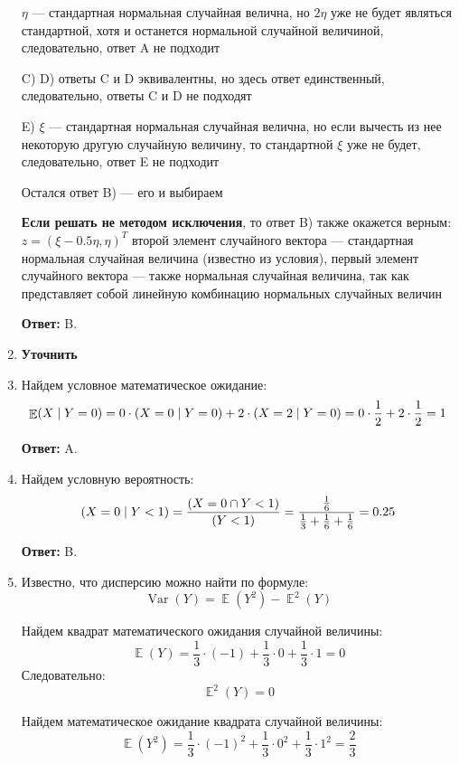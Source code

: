 \documentclass[a4paper]{article} %
\DeclareMathOperator{\Var}{Var}
\DeclareMathOperator{\E}{\mathbb{E}}
\let\P\relax
\DeclareMathOperator{\P}{\mathbb{P}}
\begin{document}
\begin{enumerate}
    $\eta$ — стандартная нормальная случайная велична, но $2\eta$ уже не будет являться стандартной, хотя и останется нормальной случайной величиной, следовательно, ответ A не подходит
    
    C) D)  ответы C и D эквивалентны, но здесь ответ единственный, следовательно, ответы C и D не подходят
    
    E) $\xi$ — стандартная нормальная случайная велична, но если вычесть из нее некоторую другую случайную величину, то стандартной $\xi$ уже не будет, следовательно, ответ E не подходит
    
    Остался ответ B) — его и выбираем
    
    \textbf{Если решать не методом исключения}, то ответ B) также окажется верным:
    $z = (\xi-0.5\eta, \eta)^T$ второй элемент случайного вектора — стандартная нормальная случайная величина (известно из условия), первый элемент случайного вектора — также нормальная случайная величина, так как представляет собой линейную комбинацию нормальных случайных величин
    
    \textbf{Ответ:} B.
    
    
    \item
    \textbf{Уточнить}

    
    \item
    Найдем условное математическое ожидание:
    \[
    \E(X \mid Y=0) = 0 \cdot \P(X=0 \mid Y=0) + 2 \cdot \P(X=2 \mid Y=0) = 0 \cdot \frac{1}{2} + 2 \cdot \frac{1}{2} = 1
    \]
    
    \textbf{Ответ:} A.
    
    
    \item
    Найдем условную вероятность:
    \[
    \P(X=0 \mid Y<1) = \frac{\P(X=0 \cap Y<1)}{\P(Y<1)} = \frac{\frac{1}{6}}{\frac{1}{3}+\frac{1}{6}+\frac{1}{6}} = 0.25
    \]
    
    \textbf{Ответ:} B.
    
    
    \item
    Известно, что дисперсию можно найти по формуле:
    \[
    \Var(Y) = \E(Y^2) - \E^2(Y)
    \]
    
    Найдем квадрат математического ожидания случайной величины:
    \[
    \E(Y) = \frac{1}{3} \cdot (-1) + \frac{1}{3} \cdot 0 + \frac{1}{3} \cdot 1 = 0
    \]
    Следовательно:
    \[
    \E^2(Y)=0
    \]
    
    Найдем математическое ожидание квадрата случайной величины:
    \[
    \E(Y^2) = \frac{1}{3} \cdot (-1)^2 + \frac{1}{3} \cdot 0^2 + \frac{1}{3} \cdot 1^2 = \frac{2}{3}
    \]
    

\end{enumerate}
\end{document}
